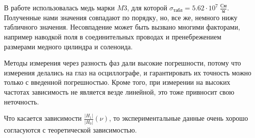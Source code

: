 \documentclass{article}
\begin{document}
	В работе использовалась медь марки $M3$, для которой $\sigma_{\text{табл}} = 5.62\cdot10^{7} \ \frac{\text{См}}{\text{м}}$.
	Полученные нами значения совпадают по порядку, но, все же, немного нижу табличного значения. Несовпадение может быть вызвано многими факторами, например наводкой поля в соединительных проводах и пренебрежением размерами медного цилиндра и соленоида. 
	
	Методы измерения через разность фаз дали высокие погрешности, потому что измерения делались на глаз на осциллографе, и гарантировать их точность можно только с введенной погрешностью. Кроме того, при измерении на высоких частотах зависимость не является везде линейной, это тоже привносит свою неточность.
	
	Что касается зависимости $\frac{|H_1|}{|H_0|}(\nu)$, то экспериментальные данные очень хорошо согласуются с теоретической зависимостью.
\end{document}
